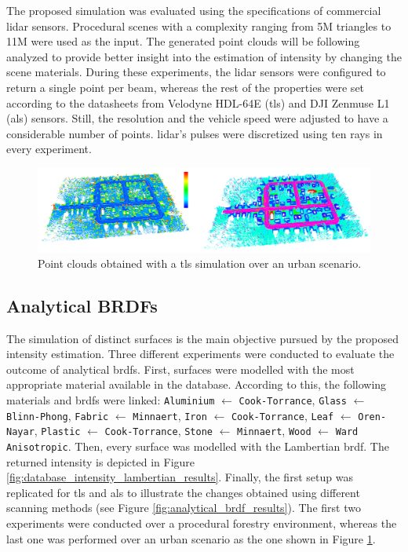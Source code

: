 The proposed simulation was evaluated using the specifications of commercial \acrshort{lidar} sensors. Procedural scenes with a complexity ranging from 5M triangles to 11M were used as the input. The generated point clouds will be following analyzed to provide better insight into the estimation of intensity by changing the scene materials. During these experiments, the \acrshort{lidar} sensors were configured to return a single point per beam, whereas the rest of the properties were set according to the datasheets from Velodyne HDL-64E (\acrshort{tls}) and DJI Zenmuse L1 (\acrshort{als}) sensors. Still, the resolution and the vehicle speed were adjusted to have a considerable number of points. \acrshort{lidar}'s pulses were discretized using ten rays in every experiment.

\begin{figure}[ht]
	\centering
	\includegraphics[width=\linewidth]{figs/lidar_intensity/experiment_scenarios.png}
	\caption{Point clouds obtained with a \acrshort{tls} simulation over an urban scenario. }
	\label{fig:lidar_intensity_experiment_scenario}
\end{figure}

\subsection{Analytical BRDFs}

The simulation of distinct surfaces is the main objective pursued by the proposed intensity estimation. Three different experiments were conducted to evaluate the outcome of analytical \acrshort{brdf}s. First, surfaces were modelled with the most appropriate material available in the database. According to this, the following materials and \acrshort{brdf}s were linked: \footnotesize\verb|Aluminium| $\gets$ \verb|Cook-Torrance|, \verb|Glass| $\gets$ \verb|Blinn-Phong|, \verb|Fabric| $\gets$ \verb|Minnaert|, \verb|Iron| $\gets$ \verb|Cook-Torrance|, \verb|Leaf| $\gets$ \verb|Oren-Nayar|, \verb|Plastic| $\gets$ \verb|Cook-Torrance|, \verb|Stone| $\gets$ \verb|Minnaert|, \verb|Wood| $\gets$ \verb|Ward Anisotropic|\normalsize. Then, every surface was modelled with the Lambertian \acrshort{brdf}. The returned intensity is depicted in Figure \ref{fig:database_intensity_lambertian_results}. Finally, the first setup was replicated for \acrshort{tls} and \acrshort{als} to illustrate the changes obtained using different scanning methods (see Figure \ref{fig:analytical_brdf_results}). The first two experiments were conducted over a procedural forestry environment, whereas the last one was performed over an urban scenario as the one shown in Figure \ref{fig:lidar_intensity_experiment_scenario}.

